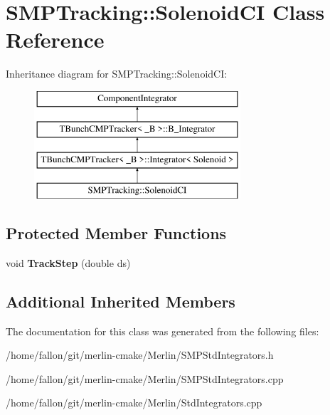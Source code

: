 \hypertarget{classSMPTracking_1_1SolenoidCI}{}\section{S\+M\+P\+Tracking\+:\+:Solenoid\+CI Class Reference}
\label{classSMPTracking_1_1SolenoidCI}
Inheritance diagram for S\+M\+P\+Tracking\+:\+:Solenoid\+CI\+:\begin{figure}[H]
\begin{center}
\leavevmode
\includegraphics[height=4.000000cm]{classSMPTracking_1_1SolenoidCI}
\end{center}
\end{figure}
\subsection*{Protected Member Functions}
\begin{DoxyCompactItemize}
\item 
\mbox{\label{classSMPTracking_1_1SolenoidCI_a7ffbd9ff72994e32ea0bf6892d4945cb}} 
void {\bfseries Track\+Step} (double ds)
\end{DoxyCompactItemize}
\subsection*{Additional Inherited Members}


The documentation for this class was generated from the following files\+:\begin{DoxyCompactItemize}
\item 
/home/fallon/git/merlin-\/cmake/\+Merlin/S\+M\+P\+Std\+Integrators.\+h\item 
/home/fallon/git/merlin-\/cmake/\+Merlin/S\+M\+P\+Std\+Integrators.\+cpp\item 
/home/fallon/git/merlin-\/cmake/\+Merlin/Std\+Integrators.\+cpp\end{DoxyCompactItemize}
